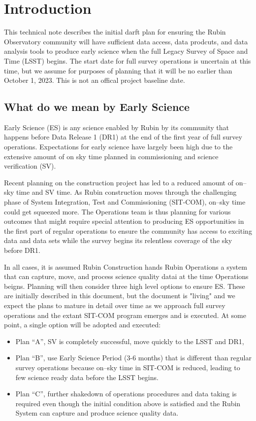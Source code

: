 \section{Introduction}
This technical note describes the initial darft plan for ensuring the Rubin Observatory community will have sufficient data access, data prodcuts, and data analysis tools to produce early science when the full Legacy Survey of Space and Time (LSST)  begins. The start date for full survey operations is uncertain at this time, but we assume for purposes of planning that it will be no earlier than October 1, 2023. This is not an offical project baseline date.

\subsection{What do we mean by Early Science}

Early Science (ES) is any science enabled by Rubin by its community that happens before Data Release 1 (DR1) at the end of the first year of full survey operations. Expectations for early science have largely been high due to the extensive amount of on sky time planned in commissioning and science verification (SV).  

Recent planning on the construction project has led to a reduced amount of on--sky time and SV time.
As Rubin construction moves through the challenging phase of System Integration, Test and Commissioning (SIT-COM), on--sky time could get squeezed more. The Operations team is thus planning for various outcomes that might require special attention to producing ES opportunities in the first part of regular operations to ensure the community has access to exciting data and data sets while the survey begins its relentless coverage of the sky before DR1.

In all cases, it is assumed Rubin Construction hands Rubin Operations a system that can capture, move, and process science quality datai at the time Operations beigns. Planning will then consider three high level options to ensure ES. These are initially described in this document, but the document is "living" and we expect the plans to mature in detail over time as we approach full survey operations and the extant SIT-COM program emerges and is executed. At some point, a single option will be adopted and executed:

\begin{itemize}

\item Plan “A”, SV is completely successful, move quickly to the LSST and DR1,

\item Plan “B”, use Early Science Period (3-6 months) that is different than regular survey operations because on--sky time in SIT-COM is reduced, leading to few science ready data before the LSST begins.

\item Plan “C”, further shakedown of operations procedures and data taking is required even though the initial condition above is satisfied and the Rubin System can capture and produce science quality data.

\end{itemize}


